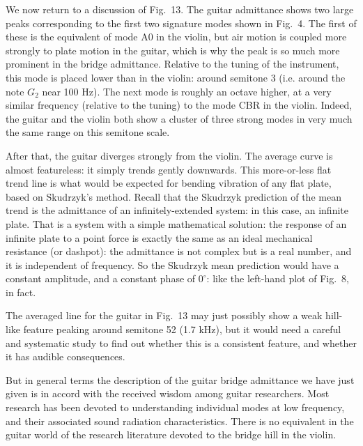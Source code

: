 
  We now return to a discussion of Fig.\ 13. The guitar admittance shows two 
  large peaks corresponding to the first two signature modes shown in Fig.\ 4. 
  The first of these is the equivalent of mode A0 in the violin, but air motion 
  is coupled more strongly to plate motion in the guitar, which is why the peak 
  is so much more prominent in the bridge admittance. Relative to the tuning of 
  the instrument, this mode is placed lower than in the violin: around semitone 
  3 (i.e. around the note $G_2$ near 100 Hz). The next mode is roughly an 
  octave higher, at a very similar frequency (relative to the tuning) to the 
  mode CBR in the violin. Indeed, the guitar and the violin both show a cluster 
  of three strong modes in very much the same range on this semitone scale. 

  After that, the guitar diverges strongly from the violin. The average curve 
  is almost featureless: it simply trends gently downwards. This more-or-less 
  flat trend line is what would be expected for bending vibration of any flat 
  plate, based on Skudrzyk's method. Recall that the Skudrzyk prediction of the 
  mean trend is the admittance of an infinitely-extended system: in this case, 
  an infinite plate. That is a system with a simple mathematical solution: the 
  response of an infinite plate to a point force is exactly the same as an 
  ideal mechanical resistance (or dashpot): the admittance is not complex but 
  is a real number, and it is independent of frequency. So the Skudrzyk mean 
  prediction would have a constant amplitude, and a constant phase of 
  $0^\circ$: like the left-hand plot of Fig.\ 8, in fact. 

  The averaged line for the guitar in Fig.\ 13 may just possibly show a weak 
  hill-like feature peaking around semitone 52 (1.7 kHz), but it would need a 
  careful and systematic study to find out whether this is a consistent 
  feature, and whether it has audible consequences. 

  But in general terms the description of the guitar bridge admittance we have 
  just given is in accord with the received wisdom among guitar researchers. 
  Most research has been devoted to understanding individual modes at low 
  frequency, and their associated sound radiation characteristics. There is no 
  equivalent in the guitar world of the research literature devoted to the 
  bridge hill in the violin. 


